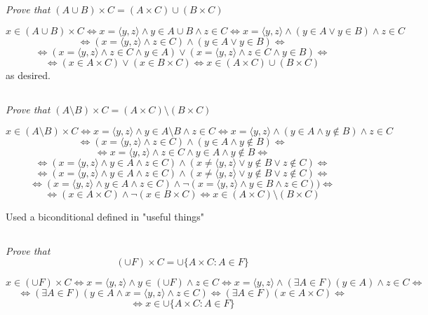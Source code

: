 \documentclass[11pt,oneside,titlepage]{book}
\DeclareMathOperator \lra {\Leftrightarrow}
\newcommand{\eangle}[1]{\langle #1 \rangle}
\begin{document}
\subsection{}

\textit{Prove that $(A \cup B) \times C = (A \times C) \cup (B \times C)$}

$$x \in (A \cup B) \times C \lra x = \eangle{y, z} \land y \in A \cup B \land z \in C
\lra  x = \eangle{y, z} \land (y \in A \lor y \in  B) \land z \in C $$
$$ \lra  (x = \eangle{y, z} \land z \in C ) \land (y \in A \lor y \in  B) \lra $$
$$\lra 
(x = \eangle{y, z} \land z \in C \land y \in A ) \lor
(x = \eangle{y, z} \land z \in C \land y \in B ) \lra$$
$$\lra 
(x \in A \times C ) \lor (x \in B \times C) \lra x \in (A \times C) \cup (B \times C)$$
as desired.

\subsection{}

\textit{Prove that $(A \setminus B) \times C = (A \times C) \setminus (B \times C)$}

$$x \in (A \setminus B) \times C \lra x = \eangle{y, z} \land y \in A \setminus B \land z \in C
\lra  x = \eangle{y, z} \land (y \in A \land y \notin  B) \land z \in C $$
$$ \lra  (x = \eangle{y, z} \land z \in C ) \land (y \in A \land y \notin  B) \lra $$
$$ \lra  x = \eangle{y, z} \land z \in C \land y \in A \land y \notin  B \lra $$
$$ \lra  (x = \eangle{y, z} \land y \in A \land z \in C) \land
 (x \neq \eangle{y, z} \lor y \notin B \lor z \notin C)  \lra $$
$$ \lra  (x = \eangle{y, z} \land y \in A \land z \in C) \land
 (x \neq \eangle{y, z} \lor y \notin B \lor z \notin C)  \lra $$
$$ \lra  (x = \eangle{y, z} \land y \in A \land z \in C) \land
\neg (x = \eangle{y, z} \land y \in B \land z \in C))  \lra $$
$$\lra 
(x \in A \times C) \land \neg (x \in B \times C) \lra x \in (A \times C) \setminus (B \times C)$$

Used a biconditional defined in "useful things"


\subsection{}

\textit{Prove that $$(\cup F) \times C = \cup\{A \times C: A \in F\}$$}

$$x \in (\cup F) \times C \lra x = \eangle{y, z} \land y \in (\cup F) \land z \in C \lra
x = \eangle{y, z} \land (\exists A \in F)(y \in A) \land z \in C \lra
$$
$$ \lra   (\exists A \in F)(y \in A \land x = \eangle{y, z} \land z \in C) \lra
(\exists A \in F)(x \in A \times C) \lra$$
$$\lra x \in  \cup\{A \times C: A \in F\}$$
\end{document}
